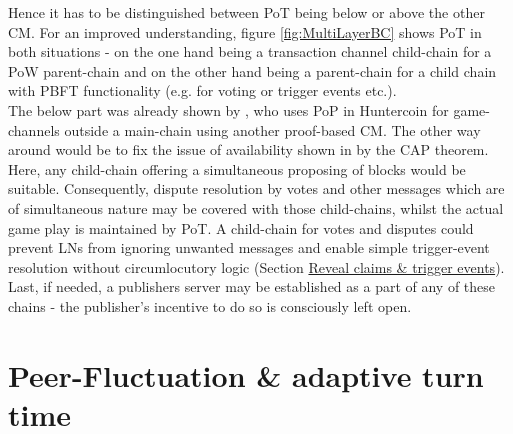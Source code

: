 Hence it has to be distinguished between \gls{PoT} being below or above the other \gls{CM}.
For an improved understanding, figure \ref{fig:MultiLayerBC} shows \gls{PoT} in both situations - on
the one hand being a transaction channel child-chain for a \gls{PoW} parent-chain and on
the other hand being a parent-chain for a child chain with \gls{PBFT} functionality (e.g. for voting or trigger events etc.). \\
The below part was already shown by \cite{Kraft.2016}, who uses \gls{PoP} in Huntercoin for game-channels outside a main-chain using another proof-based \gls{CM}.
The other way around would be to fix the  issue of availability shown in by the CAP theorem.
Here, any child-chain offering a simultaneous proposing of blocks would be suitable.
Consequently, dispute resolution by votes and other messages which are of simultaneous nature may be covered with those child-chains, whilst the actual game play is maintained by \gls{PoT}.
A child-chain for votes and disputes could prevent \gls{LN}s from ignoring unwanted messages and enable simple trigger-event resolution
without circumlocutory logic (Section \hyperref[sec:ClaimsAndTriggers]{Reveal claims \& trigger events}).
Last, if needed, a publishers server may be established as a part of any of these chains - the publisher's incentive to do so is consciously left open.



\FloatBarrier

\section{Peer-Fluctuation \& adaptive turn time}
\label{sec:PeerFluctuation}

